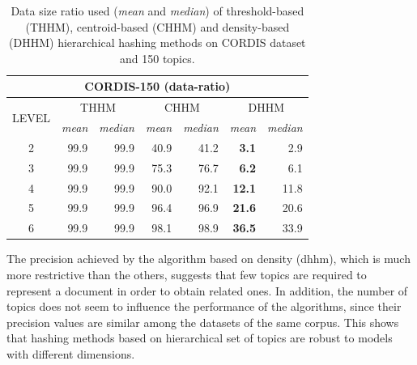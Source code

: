 \begin{table}\centering
  \scriptsize
  \begin{tabular}{c|rr||rr||rr}
    \multicolumn{7}{c}{CORDIS-150 (data-ratio)} \\
    \toprule
    \multirow{2}{*}{LEVEL} &
      \multicolumn{2}{c}{THHM} &
      \multicolumn{2}{c}{CHHM} &
      \multicolumn{2}{c}{DHHM} \\
      & {\textit{mean}} & {\textit{median}} & {\textit{mean}} & {\textit{median}} & {\textit{mean}} & {\textit{median}} \\
      \midrule
    2 & 99.9 & 99.9 & 40.9 & 41.2 & \textbf{3.1} & 2.9 \\
    3 & 99.9 & 99.9 & 75.3 & 76.7 & \textbf{6.2} & 6.1 \\
    4 & 99.9 & 99.9 & 90.0 & 92.1 & \textbf{12.1} & 11.8 \\
    5 & 99.9 & 99.9 & 96.4 & 96.9 & \textbf{21.6} & 20.6 \\
    6 & 99.9 & 99.9 & 98.1 & 98.9 & \textbf{36.5} & 33.9 \\
    \bottomrule
  \end{tabular}
\caption{Data size ratio used (\textit{mean} and \textit{median}) of threshold-based (THHM), centroid-based (CHHM) and density-based (DHHM) hierarchical hashing methods on CORDIS dataset and 150 topics.}
\label{tb:cordis150-d}
\end{table}

The precision achieved by the algorithm based on density (dhhm), which is much more restrictive than the others, suggests that few topics are required to represent a document in order to obtain related ones. In addition, the number of topics does not seem to influence the performance of the algorithms, since their precision values are similar among the datasets of the same corpus. This shows that hashing methods based on hierarchical set of topics are robust to models with different dimensions.


